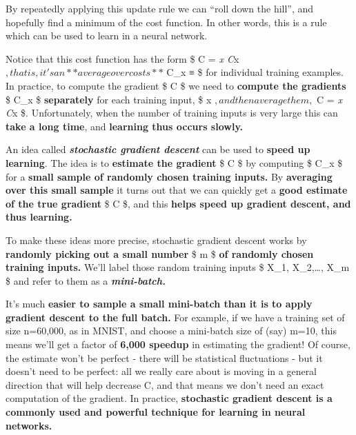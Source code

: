 \documentclass[]{article}
\begin{document}
By repeatedly applying this update rule we can ``roll down the hill'',
and hopefully find a minimum of the cost function. In other words, this
is a rule which can be used to learn in a neural network.

Notice that this cost function has the form \$ C = 
\sum\emph{x C}x $, that is, it's an **average over costs** $ C\_x ≡
 \$ for individual training examples. In
practice, to compute the gradient \$ \nabla C \$ we need to
\textbf{compute the gradients} \$ \nabla C\_x \$ \textbf{separately} for
each training input, \$ x $, and then average them, $ \nabla C =
 \sum\emph{x \nabla C}x \$. Unfortunately, when the number of
training inputs is very large this can \textbf{take a long time}, and
\textbf{learning thus occurs slowly.}

An idea called \textbf{\emph{stochastic gradient descent}} can be used
to \textbf{speed up learning}. The idea is to \textbf{estimate the
gradient} \$ \nabla C \$ by computing \$ \nabla C\_x \$ for a
\textbf{small sample of randomly chosen training inputs.} By
\textbf{averaging over this small sample} it turns out that we can
quickly get a \textbf{good estimate of the true gradient} \$ \nabla C
\$, and this \textbf{helps speed up gradient descent, and thus
learning.}

To make these ideas more precise, stochastic gradient descent works by
\textbf{randomly picking out a small number} \$ m \$ \textbf{of randomly
chosen training inputs.} We'll label those random training inputs \$
X\_1, X\_2,\ldots{}, X\_m \$ and refer to them as a
\textbf{\emph{mini-batch.}}

It's much \textbf{easier to sample a small mini-batch than it is to
apply gradient descent to the full batch.} For example, if we have a
training set of size n=60,000, as in MNIST, and choose a mini-batch size
of (say) m=10, this means we'll get a factor of \textbf{6,000 speedup}
in estimating the gradient! Of course, the estimate won't be perfect -
there will be statistical fluctuations - but it doesn't need to be
perfect: all we really care about is moving in a general direction that
will help decrease C, and that means we don't need an exact computation
of the gradient. In practice, \textbf{stochastic gradient descent is a
commonly used and powerful technique for learning in neural networks.}
\end{document}
